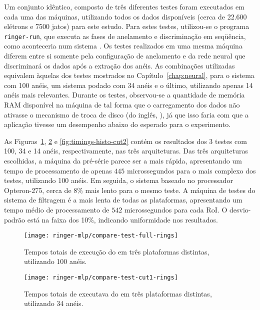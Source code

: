 Um conjunto idêntico, composto de três diferentes testes foram executados em
cada uma das máquinas, utilizando todos os dados disponíveis (cerca de 22.600
elétrons e 7500 jatos) para este estudo. Para estes testes, utilizou-se o
programa \texttt{ringer-run}, que executa as fases de anelamento e
discriminação em seqüência, como aconteceria num sistema .  Os
testes realizados em uma mesma máquina diferem entre si somente pela
configuração de anelamento e da rede neural que discriminará os dados após a
extração dos anéis. As combinações utilizadas equivalem àquelas dos testes
mostrados no Capítulo~\ref{chap:neural}, para o sistema com 100 anéis, um
sistema podado com 34 anéis e o último, utilizando apenas 14 anéis mais
relevantes. Durante os testes, observou-se a quantidade de memória RAM
disponível na máquina de tal forma que o carregamento dos dados não ativasse o
mecanismo de troca de disco (do inglês, ), já que isso faria com que
a aplicação tivesse um desempenho abaixo do esperado para o experimento.

As Figuras~\ref{fig:timings-histo-full}, \ref{fig:timings-histo-cut1} e
\ref{fig:timings-histo-cut2} contém os resultados dos 3 testes com 100, 34 e
14 anéis, respectivamente, nas três arquiteturas. Das três arquiteturas
escolhidas, a máquina da pré-série parece ser a mais rápida, apresentando um
tempo de processamento de apenas $445$ microssegundos para o mais complexo dos
testes, utilizando 100 anéis. Em seguida, o sistema baseado no processador
Opteron-275, cerca de 8\% mais lento para o mesmo teste. A máquina de testes
do sistema de filtragem é a mais lenta de todas as plataformas, apresentando
um tempo médio de processamento de $542$ microssegundos para cada RoI. O
desvio-padrão está na faixa dos 10\%, indicando uniformidade nos resultados.

\begin{figure}
\begin{center}
\texttt{[image: ringer-mlp/compare-test-full-rings]}
\end{center}
\caption{Tempos totais de execução do  em três plataformas
distintas, utilizando 100 anéis.}
\label{fig:timings-histo-full}
\end{figure}

\begin{figure}
\begin{center}
\texttt{[image: ringer-mlp/compare-test-cut1-rings]}
\end{center}
\caption{Tempos totais de executava do  em três plataformas
distintas, utilizando 34 anéis.}
\label{fig:timings-histo-cut1}
\end{figure}

